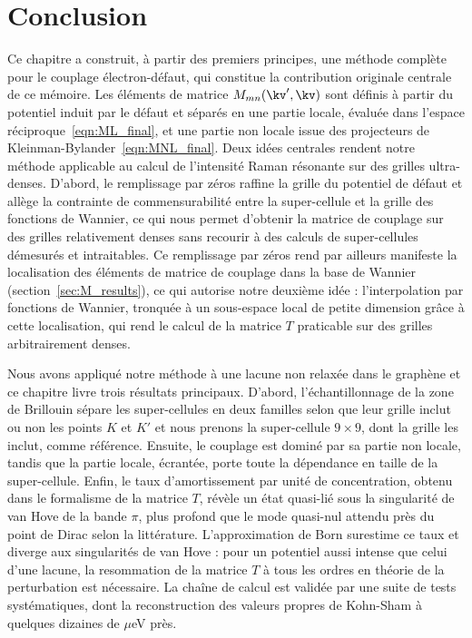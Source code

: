\section{Conclusion}
Ce chapitre a construit, à partir des premiers principes, une méthode complète pour le couplage électron-défaut, qui constitue la contribution originale centrale de ce mémoire. Les éléments de matrice $M_{mn}(\kv',\kv)$ sont définis à partir du potentiel induit par le défaut et séparés en une partie locale, évaluée dans l'espace réciproque~\eqref{eqn:ML_final}, et une partie non locale issue des projecteurs de Kleinman-Bylander~\eqref{eqn:MNL_final}. Deux idées centrales rendent notre méthode applicable au calcul de l'intensité Raman résonante sur des grilles ultra-denses. D'abord, le remplissage par zéros raffine la grille du potentiel de défaut et allège la contrainte de commensurabilité entre la super-cellule et la grille des fonctions de Wannier, ce qui nous permet d'obtenir la matrice de couplage sur des grilles relativement denses sans recourir à des calculs de super-cellules démesurés et intraitables. Ce remplissage par zéros rend par ailleurs manifeste la localisation des éléments de matrice de couplage dans la base de Wannier (section~\ref{sec:M_results}), ce qui autorise notre deuxième idée : l'interpolation par fonctions de Wannier, tronquée à un sous-espace local de petite dimension grâce à cette localisation, qui rend le calcul de la matrice $T$ praticable sur des grilles arbitrairement denses.

Nous avons appliqué notre méthode à une lacune non relaxée dans le graphène et ce chapitre livre trois résultats principaux. D'abord, l'échantillonnage de la zone de Brillouin sépare les super-cellules en deux familles selon que leur grille inclut ou non les points $K$ et $K'$ et nous prenons la super-cellule $9\times 9$, dont la grille les inclut, comme référence. Ensuite, le couplage est dominé par sa partie non locale, tandis que la partie locale, écrantée, porte toute la dépendance en taille de la super-cellule. Enfin, le taux d'amortissement par unité de concentration, obtenu dans le formalisme de la matrice $T$, révèle un état quasi-lié sous la singularité de van Hove de la bande $\pi$, plus profond que le mode quasi-nul attendu près du point de Dirac selon la littérature. L'approximation de Born surestime ce taux et diverge aux singularités de van Hove : pour un potentiel aussi intense que celui d'une lacune, la resommation de la matrice $T$ à tous les ordres en théorie de la perturbation est nécessaire. La chaîne de calcul est validée par une suite de tests systématiques, dont la reconstruction des valeurs propres de Kohn-Sham à quelques dizaines de $\mu$eV près.

